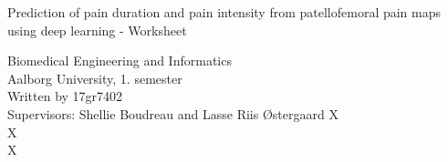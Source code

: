 \clearpage
\thispagestyle{empty}




\begin{center}
\vspace*{20\baselineskip}

{\huge Prediction of pain duration and pain intensity from patellofemoral pain maps using deep learning \vspace{0.3cm} \newline - Worksheet }\\[0.2\baselineskip] %

\vspace*{15\baselineskip}


\end{center} %
Biomedical Engineering and Informatics \\
Aalborg University, 1. semester \\
Written by 17gr7402 \\
Supervisors: Shellie Boudreau and Lasse Riis Østergaard
{\color{white}X \\ X \\ X \\}

%	

